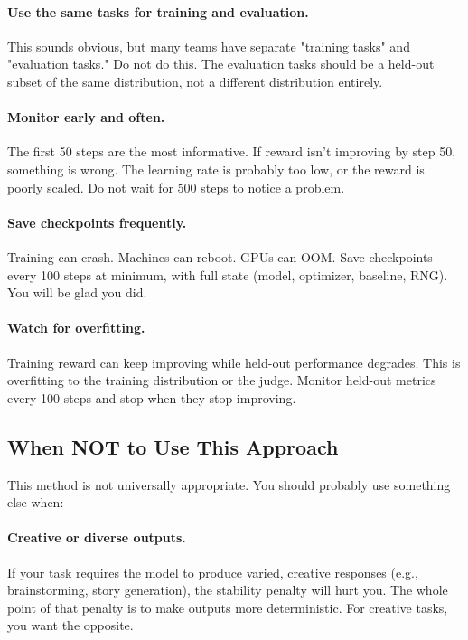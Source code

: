 \documentclass[11pt]{article}
\begin{document}
\paragraph{Use the same tasks for training and evaluation.}
This sounds obvious, but many teams have separate "training tasks" and "evaluation tasks."
Do not do this.
The evaluation tasks should be a held-out subset of the same distribution, not a different distribution entirely.

\paragraph{Monitor early and often.}
The first 50 steps are the most informative.
If reward isn't improving by step 50, something is wrong.  The learning rate is probably too low, or the reward is poorly scaled.
Do not wait for 500 steps to notice a problem.

\paragraph{Save checkpoints frequently.}
Training can crash.
Machines can reboot.
GPUs can OOM.
Save checkpoints every 100 steps at minimum, with full state (model, optimizer, baseline, RNG).
You will be glad you did.

\paragraph{Watch for overfitting.}
Training reward can keep improving while held-out performance degrades.
This is overfitting to the training distribution or the judge.
Monitor held-out metrics every 100 steps and stop when they stop improving.

\subsection{When NOT to Use This Approach}

This method is not universally appropriate.
You should probably use something else when:

\paragraph{Creative or diverse outputs.}
If your task requires the model to produce varied, creative responses (e.g., brainstorming, story generation), the stability penalty will hurt you.
The whole point of that penalty is to make outputs more deterministic.
For creative tasks, you want the opposite.
\end{document}
